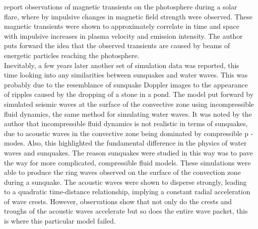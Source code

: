 \cite{2001ApJ...550L.105K} report observations of magnetic transients on the photosphere during a solar flare, where by impulsive changes in magnetic field strength were observed. These magnetic transients were shown to approximately correlate in time and space with impulsive increases in plasma velocity and emission intensity. The author puts forward the idea that the observed transients are caused by beams of energetic particles reaching the photosphere.\\   


Inevitably, a few years later another set of simulation data was reported, this time looking into any similarities between sunquakes and water waves. This was probably due to the resemblance of sunquake Doppler images to the appearance of ripples caused by the dropping of a stone in a pond. The model put forward by \cite{2003SoPh..218..227P} simulated seismic waves at the surface of the convective zone using incompressible fluid dynamics, the same method for simulating water waves. It was noted by the author that incompressible fluid dynamics is not realistic in terms of sunquakes, due to acoustic waves in the convective zone being dominated by compressible p - modes. Also, this highlighted the fundamental difference in the physics of water waves and sunquakes. The reason sunquakes were studied in this way was to pave the way for more complicated, compressible fluid models. These simulations were able to produce the ring waves observed on the surface of the convection zone during a sunquake. The acoustic waves were shown to disperse strongly, leading to a quadratic time-distance relationship, implying a constant radial acceleration of wave crests. However, observations show that not only do the crests and troughs of the acoustic waves accelerate but so does the entire wave packet, this is where this particular model failed.\\


